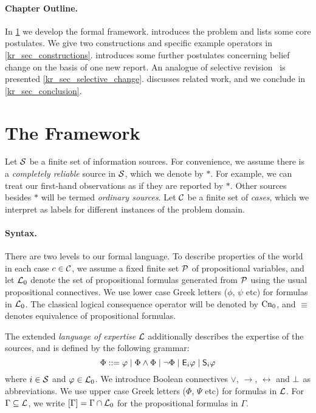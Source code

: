 \paragraph{Chapter Outline.} In \cref{kr_sec_framework} we develop the formal
framework.  introduces the problem and lists some core
postulates. We give two constructions and specific example operators in
\cref{kr_sec_constructions}.  introduces some
further postulates concerning belief change on the basis of one new report. An
analogue of selective revision~\cite{ferme1999selective} is presented
\cref{kr_sec_selective_change}.  discusses related work, and
we conclude in \cref{kr_sec_conclusion}.

\section{The Framework}
\label{kr_sec_framework}

Let $\mathcal{S}$ be a finite set of information sources. For convenience, we assume
there is a \emph{completely reliable} source in $\mathcal{S}$, which we denote by
$\ast$.  For example, we can treat our first-hand observations as if they are
reported by $\ast$. Other sources besides $\ast$ will be termed \emph{ordinary
sources}.  Let $\mathcal{C}$ be a finite set of \emph{cases}, which we interpret as
labels for different instances of the problem domain.

\paragraph{Syntax.}

There are two levels to our formal language. To describe properties of the
world in each case $c \in \mathcal{C}$, we assume a fixed finite set $\mathcal{P}$ of propositional
variables, and let $\mathcal{L}{}_0$ denote the set of propositional formulas generated
from $\mathcal{P}$ using the usual propositional connectives. We use lower case
Greek letters ($\phi$, $\psi$ etc) for formulas in $\mathcal{L}{}_0$. The
classical logical consequence operator will be denoted by $\operatorname{Cn}_0$, and
$\equiv$ denotes equivalence of propositional formulas.

The extended \emph{language of expertise} $\mathcal{L}{}$ additionally describes the
expertise of the sources, and is defined by the following grammar:
\[
    \Phi ::= \varphi \mid
             \Phi \land \Phi \mid
             \neg \Phi \mid
             \mathsf{E}_i\varphi \mid
             \mathsf{S}_i\varphi
             \\
\]
where $i\in \mathcal{S}$ and $\varphi \in \mathcal{L}{}_0$. We introduce Boolean connectives
$\lor$, $\rightarrow$, $\leftrightarrow$ and $\bot$ as
abbreviations. We use upper case Greek letters ($\Phi$, $\Psi$ etc)
for formulas in $\mathcal{L}{}$.
%
For $\Gamma \subseteq \mathcal{L}{}$, we write $\left[{\Gamma}\right] = \Gamma \cap
\mathcal{L}{}_0$ for the propositional formulas in $\Gamma$.

